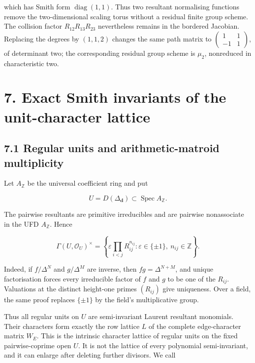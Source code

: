 \documentclass[
  11pt,
  a4paper,
]{article}
\begin{document}
which has Smith form \(\operatorname{diag}(1,1)\). Thus two resultant
normalising functions remove the two-dimensional scaling torus without a
residual finite group scheme. The collision factor
\(R_{12}R_{13}R_{23}\) nevertheless remains in the bordered Jacobian.
Replacing the degrees by \((1,1,2)\) changes the same path matrix to
\(\left(\begin{smallmatrix}1&1\\-1&1\end{smallmatrix}\right)\), of
determinant two; the corresponding residual group scheme is \(\mu_2\),
nonreduced in characteristic two.

\section{7. Exact Smith invariants of the unit-character
lattice}\label{exact-smith-invariants-of-the-unit-character-lattice}

\subsection{7.1 Regular units and arithmetic-matroid
multiplicity}\label{regular-units-and-arithmetic-matroid-multiplicity}

Let \(A_{\mathbb Z}\) be the universal coefficient ring and put

\[
 U=D(\Delta_{\mathbf d})\subset\operatorname{Spec}A_{\mathbb Z}.
\]

The pairwise resultants are primitive irreducibles and are pairwise
nonassociate in the UFD \(A_{\mathbb Z}\). Hence

\[
 \boxed{
 \Gamma(U,\mathcal O_U)^\times
 =\left\{\varepsilon\prod_{i<j}R_{ij}^{n_{ij}}:
 \varepsilon\in\{\pm1\},\ n_{ij}\in\mathbb Z\right\}.
 }
\tag{7.1}
\]

Indeed, if \(f/\Delta^N\) and \(g/\Delta^M\) are inverse, then
\(fg=\Delta^{N+M}\), and unique factorisation forces every irreducible
factor of \(f\) and \(g\) to be one of the \(R_{ij}\). Valuations at the
distinct height-one primes \((R_{ij})\) give uniqueness. Over a field,
the same proof replaces \(\{\pm1\}\) by the field's multiplicative
group.

Thus all regular units on \(U\) are semi-invariant Laurent resultant
monomials. Their characters form exactly the row lattice \(L\) of the
complete edge-character matrix \(W_E\). This is the intrinsic character
lattice of regular units on the fixed pairwise-coprime open \(U\). It is
not the lattice of every polynomial semi-invariant, and it can enlarge
after deleting further divisors. We call
\end{document}
